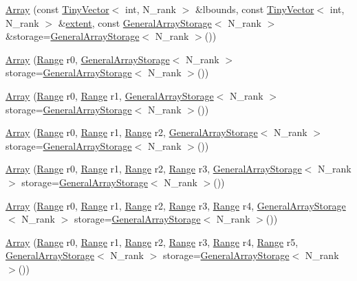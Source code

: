 \begin{DoxyCompactItemize}
\item 
\hyperlink{classArray_a00f1792ac9d4f8b56959d2778e83ed3c}{Array} (const \hyperlink{classTinyVector}{Tiny\+Vector}$<$ int, N\+\_\+rank $>$ \&lbounds, const \hyperlink{classTinyVector}{Tiny\+Vector}$<$ int, N\+\_\+rank $>$ \&\hyperlink{classArray_a0e366d6568c6f976ea3657fea13794b7}{extent}, const \hyperlink{classGeneralArrayStorage}{General\+Array\+Storage}$<$ N\+\_\+rank $>$ \&storage=\hyperlink{classGeneralArrayStorage}{General\+Array\+Storage}$<$ N\+\_\+rank $>$())
\item 
\hyperlink{classArray_a41920fea594ff80d74e4501c4c2ce7c7}{Array} (\hyperlink{classRange}{Range} r0, \hyperlink{classGeneralArrayStorage}{General\+Array\+Storage}$<$ N\+\_\+rank $>$ storage=\hyperlink{classGeneralArrayStorage}{General\+Array\+Storage}$<$ N\+\_\+rank $>$())
\item 
\hyperlink{classArray_ad2cdb01aa8562b2e66d4035f5c17859f}{Array} (\hyperlink{classRange}{Range} r0, \hyperlink{classRange}{Range} r1, \hyperlink{classGeneralArrayStorage}{General\+Array\+Storage}$<$ N\+\_\+rank $>$ storage=\hyperlink{classGeneralArrayStorage}{General\+Array\+Storage}$<$ N\+\_\+rank $>$())
\item 
\hyperlink{classArray_a8ef721482e73258e9efab67bf0ccc24e}{Array} (\hyperlink{classRange}{Range} r0, \hyperlink{classRange}{Range} r1, \hyperlink{classRange}{Range} r2, \hyperlink{classGeneralArrayStorage}{General\+Array\+Storage}$<$ N\+\_\+rank $>$ storage=\hyperlink{classGeneralArrayStorage}{General\+Array\+Storage}$<$ N\+\_\+rank $>$())
\item 
\hyperlink{classArray_ab24a1bbedcdb2512b7446502e60ab265}{Array} (\hyperlink{classRange}{Range} r0, \hyperlink{classRange}{Range} r1, \hyperlink{classRange}{Range} r2, \hyperlink{classRange}{Range} r3, \hyperlink{classGeneralArrayStorage}{General\+Array\+Storage}$<$ N\+\_\+rank $>$ storage=\hyperlink{classGeneralArrayStorage}{General\+Array\+Storage}$<$ N\+\_\+rank $>$())
\item 
\hyperlink{classArray_a85363956915d2a24f7c840d5db6cf524}{Array} (\hyperlink{classRange}{Range} r0, \hyperlink{classRange}{Range} r1, \hyperlink{classRange}{Range} r2, \hyperlink{classRange}{Range} r3, \hyperlink{classRange}{Range} r4, \hyperlink{classGeneralArrayStorage}{General\+Array\+Storage}$<$ N\+\_\+rank $>$ storage=\hyperlink{classGeneralArrayStorage}{General\+Array\+Storage}$<$ N\+\_\+rank $>$())
\item 
\hyperlink{classArray_a6ec1fb88fac78b338b527d77a0cfaf1e}{Array} (\hyperlink{classRange}{Range} r0, \hyperlink{classRange}{Range} r1, \hyperlink{classRange}{Range} r2, \hyperlink{classRange}{Range} r3, \hyperlink{classRange}{Range} r4, \hyperlink{classRange}{Range} r5, \hyperlink{classGeneralArrayStorage}{General\+Array\+Storage}$<$ N\+\_\+rank $>$ storage=\hyperlink{classGeneralArrayStorage}{General\+Array\+Storage}$<$ N\+\_\+rank $>$())

\end{DoxyCompactItemize}
